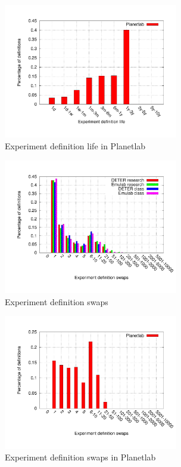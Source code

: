 \documentclass[10pt, twocolumn]{article} %
\begin{document}
\begin{figure}[htbp] \begin{center} \includegraphics[width=3in,
type=pdf,ext=.pdf,read=.pdf]{figs/planet.life.gnu} \caption{Experiment
definition life in Planetlab} \label{explife} \end{center} \end{figure}

\begin{figure}[htbp] \begin{center} \includegraphics[width=3in,
type=pdf,ext=.pdf,read=.pdf]{figs/exp.swaps.gnu} \caption{Experiment
definition swaps} \label{expswaps} \end{center} \end{figure}

\begin{figure}[htbp] \begin{center} \includegraphics[width=3in,
type=pdf,ext=.pdf,read=.pdf]{figs/planet.swaps.gnu} \caption{Experiment
definition swaps in Planetlab} \label{expswaps} \end{center}
\end{figure}
\end{document}
